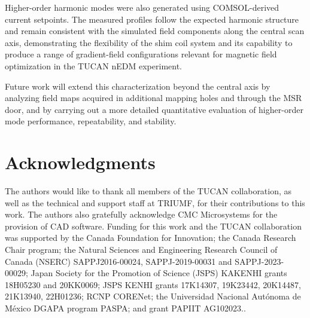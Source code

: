 \documentclass[preprint,12pt]{elsarticle}
\begin{document}
Higher-order harmonic modes were also generated using COMSOL-derived current setpoints. The measured profiles follow the expected harmonic structure and remain consistent with the simulated field components along the central scan axis, demonstrating the flexibility of the shim coil system and its capability to produce a range of gradient-field configurations relevant for magnetic field optimization in the TUCAN nEDM experiment.

Future work will extend this characterization beyond the central axis by analyzing field maps acquired in additional mapping holes and through the MSR door, and by carrying out a more detailed quantitative evaluation of higher-order mode performance, repeatability, and stability.


\section*{Acknowledgments}
The authors would like to thank all members of the TUCAN collaboration, as well as the technical and support staff at TRIUMF, for their contributions to this work. The authors also gratefully acknowledge CMC Microsystems for the provision of CAD software. Funding for this work and the TUCAN collaboration was supported by the Canada Foundation for Innovation; the Canada Research Chair program; the Natural Sciences and Engineering Research Council of Canada (NSERC) SAPPJ2016-00024, SAPPJ-2019-00031 and SAPPJ-2023-00029; Japan Society for the Promotion of Science (JSPS) KAKENHI grants 18H05230 and 20KK0069; JSPS KENHI grants 17K14307, 19K23442, 20K14487, 21K13940, 22H01236; RCNP CORENet; the Universidad Nacional Autónoma de México DGAPA program PASPA; and grant PAPIIT AG102023..



\end{document}
